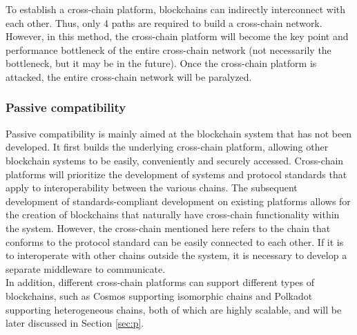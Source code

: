 \begin{enumerate}
\begin{figure}[H]
        \end{figure}
    To establish a cross-chain platform, blockchains can indirectly interconnect with each other. Thus, only 4 paths are required to build a cross-chain network. However, in this method, the cross-chain platform will become the key point and performance bottleneck of the entire cross-chain network (not necessarily the bottleneck, but it may be in the future). Once the cross-chain platform is attacked, the entire cross-chain network will be paralyzed.
\end{enumerate}
\subsubsection{Passive compatibility}
\noindent Passive compatibility is mainly aimed at the blockchain system that has not been developed. It first builds the underlying cross-chain platform, allowing other blockchain systems to be easily, conveniently and securely accessed. Cross-chain platforms will prioritize the development of systems and protocol standards that apply to interoperability between the various chains. The subsequent development of standards-compliant development on existing platforms allows for the creation of blockchains that naturally have cross-chain functionality within the system. However, the cross-chain mentioned here refers to the chain that conforms to the protocol standard can be easily connected to each other. If it is to interoperate with other chains outside the system, it is necessary to develop a separate middleware to communicate.\\
\noindent In addition, different cross-chain platforms can support different types of blockchains, such as Cosmos supporting isomorphic chains and Polkadot supporting heterogeneous chains, both of which are highly scalable, and will be later discussed in Section \ref{sec:p}.